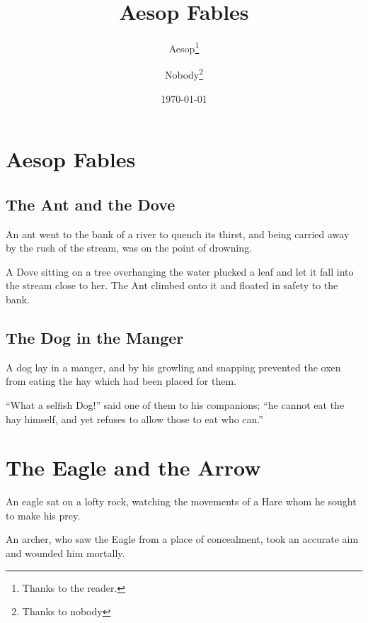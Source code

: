 \documentclass{report}
\title{Aesop Fables}
\author{Aesop\thanks{Thanks to the reader.}
       \and Nobody\thanks{Thanks to nobody}}
\date{\today}
\begin{document}
\maketitle
\tableofcontents
\chapter{Aesop Fables}
\section{The Ant and the Dove}

An ant went to the bank of a river to quench its thirst, and
being carried away by the rush of the stream, was on the
point of drowning.

A Dove
sitting on a tree overhanging the water plucked a
leaf and let it fall into the stream close to her. The Ant
climbed onto it and floated in safety to the bank.

\section{The Dog in the Manger}

A dog lay in a manger, and by his growling and snapping
prevented the oxen from eating the hay which had been
placed for them.

``What a selfish Dog!'' said one of them to his companions;
``he cannot eat the hay himself, and yet refuses to allow
those to eat who can.''

\chapter{The Eagle and the Arrow}

An eagle sat on a lofty rock, watching the movements of a
Hare whom he sought to make his prey.

An archer, who saw the Eagle from a place of concealment,
took an accurate aim and wounded him mortally.
\end{document}
